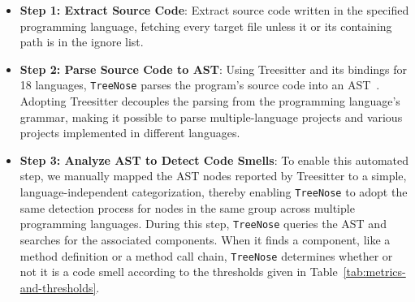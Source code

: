 \begin{itemize}[leftmargin=*]
    \item \textbf{Step 1: Extract Source Code}: Extract source code written in
        the specified programming language, fetching every target file unless
        it or its containing path is in the ignore list.
    \item \textbf{Step 2: Parse Source Code to AST}: Using Treesitter and its
        bindings for 18 languages, \texttt{TreeNose} parses the program's source
        code into an AST~\cite{treeSitter}. Adopting Treesitter decouples the
        parsing from the programming language's grammar, making it possible to
        parse multiple-language projects and various projects implemented in
        different languages.
    \item \textbf{Step 3: Analyze AST to Detect Code Smells}: To enable this
        automated step, we manually mapped the AST nodes reported by Treesitter
        to a simple, language-independent categorization, thereby enabling
        \texttt{TreeNose} to adopt the same detection process for nodes in the
        same group across multiple programming languages. During this step,
        \texttt{TreeNose} queries the AST and searches for the associated
        components. When it finds a component, like a method definition or a
        method call chain, \texttt{TreeNose} determines whether or not it is a
        code smell according to the thresholds given in
        Table~\ref{tab:metrics-and-thresholds}.
\end{itemize}


